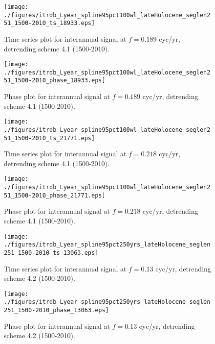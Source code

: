 \documentclass[phd,tocprelim]{cornell}
\begin{document}
\begin{figure}[!tbp]
\centering
\begin{minipage}[b]{0.45\textwidth}
\texttt{[image: ./figures/itrdb\_Lyear\_spline95pct100wl\_lateHolocene\_seglen251\_1500-2010\_ts\_18933.eps]}
\caption{Time series plot for interannual signal at $f=0.189$ cyc/yr, detrending scheme 4.1 (1500-2010).}
\label{ts4.1p2}
\end{minipage}
\hfill
\begin{minipage}[b]{0.45\textwidth}
\texttt{[image: ./figures/itrdb\_Lyear\_spline95pct100wl\_lateHolocene\_seglen251\_1500-2010\_phase\_18933.eps]}
\caption{Phase plot for interannual signal at $f=0.189$ cyc/yr, detrending scheme 4.1 (1500-2010).}
\label{map4.1p2}
\end{minipage}
\end{figure}

\begin{figure}[!tbp]
\centering
\begin{minipage}[b]{0.45\textwidth}
\texttt{[image: ./figures/itrdb\_Lyear\_spline95pct100wl\_lateHolocene\_seglen251\_1500-2010\_ts\_21771.eps]}
\caption{Time series plot for interannual signal at $f=0.218$ cyc/yr, detrending scheme 4.1 (1500-2010).}
\label{ts4.1p3}
\end{minipage}
\hfill
\begin{minipage}[b]{0.45\textwidth}
\texttt{[image: ./figures/itrdb\_Lyear\_spline95pct100wl\_lateHolocene\_seglen251\_1500-2010\_phase\_21771.eps]}
\caption{Phase plot for interannual signal at $f=0.218$ cyc/yr, detrending scheme 4.1 (1500-2010).}
\label{map4.1p3}
\end{minipage}
\end{figure}


\clearpage
\newpage

\begin{figure}[!tbp]
\centering
\begin{minipage}[b]{0.45\textwidth}
\texttt{[image: ./figures/itrdb\_Lyear\_spline95pct250yrs\_lateHolocene\_seglen251\_1500-2010\_ts\_13063.eps]}
\caption{Time series plot for interannual signal at $f=0.13$ cyc/yr, detrending scheme 4.2 (1500-2010).}
\label{ts4.2p1}
\end{minipage}
\hfill
\begin{minipage}[b]{0.45\textwidth}
\texttt{[image: ./figures/itrdb\_Lyear\_spline95pct250yrs\_lateHolocene\_seglen251\_1500-2010\_phase\_13063.eps]}
\caption{Phase plot for interannual signal at $f=0.13$ cyc/yr, detrending scheme 4.2 (1500-2010).}
\label{map4.2p1}
\end{minipage}
\end{figure}
\end{document}

